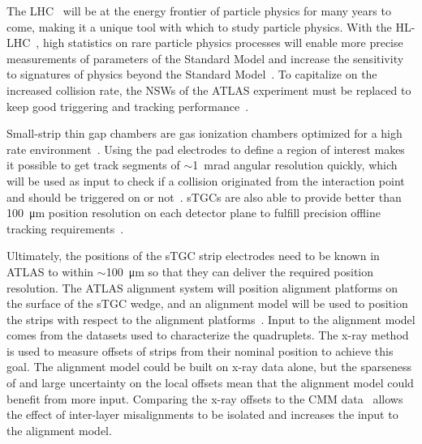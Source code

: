 The LHC~\cite{evans_lhc_2008} will be at the energy frontier of particle physics for many years to come, making it a unique tool with which to study particle physics. With the HL-LHC~\cite{hl_lhc_tdr}, high statistics on rare particle physics processes will enable more precise measurements of parameters of the Standard Model and increase the sensitivity to signatures of physics beyond the Standard Model~\cite{dainese_physics_2018}. To capitalize on the increased collision rate, the NSWs of the ATLAS experiment must be replaced to keep good triggering and tracking performance~\cite{nsw_tdr}. 

Small-strip thin gap chambers are gas ionization chambers optimized for a high rate environment~\cite{nsw_tdr}. Using the pad electrodes to define a region of interest makes it possible to get track segments of $\sim$\SI{1}{mrad} angular resolution quickly, which will be used as input to check if a collision originated from the interaction point and should be triggered on or not~\cite{nsw_tdr, perez-codina_small-strip_2016}. sTGCs are also able to provide better than \SI{100}{\micro\meter} position resolution on each detector plane to fulfill precision offline tracking requirements~\cite{abusleme_performance_2016}. 

Ultimately, the positions of the sTGC strip electrodes need to be known in ATLAS to within $\sim$\SI{100}{\micro\meter} so that they can deliver the required position resolution. The ATLAS alignment system will position alignment platforms on the surface of the sTGC wedge, and an alignment model will be used to position the strips with respect to the alignment platforms~\cite{nsw_tdr}. Input to the alignment model comes from the datasets used to characterize the quadruplets. The x-ray method~\cite{lefebvre_precision_2020} is used to measure offsets of strips from their nominal position to achieve this goal. The alignment model could be built on x-ray data alone, but the sparseness of and large uncertainty on the local offsets mean that the alignment model could benefit from more input. Comparing the x-ray offsets to the CMM data~\cite{carlson_results_2019} allows the effect of inter-layer misalignments to be isolated and increases the input to the alignment model. 

